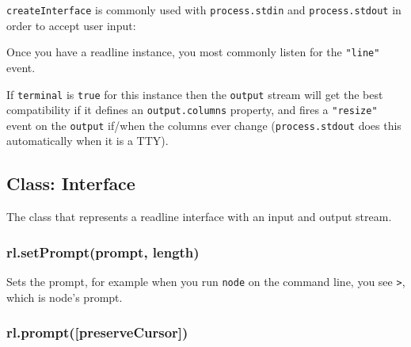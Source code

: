\begin{Shaded}
\begin{Highlighting}[]
 
  \NormalTok{callback(null, [[}\NormalTok{], linePartial]);}
\NormalTok{\}}
\end{Highlighting}
\end{Shaded}

\texttt{createInterface} is commonly used with \texttt{process.stdin}
and \texttt{process.stdout} in order to accept user input:

\begin{Shaded}
\begin{Highlighting}[]
 \NormalTok{);}
 \NormalTok{(\{}
  \NormalTok{: }\NormalTok{,}
  \NormalTok{: }
\NormalTok{\});}
\end{Highlighting}
\end{Shaded}

Once you have a readline instance, you most commonly listen for the
\texttt{"line"} event.

If \texttt{terminal} is \texttt{true} for this instance then the
\texttt{output} stream will get the best compatibility if it defines an
\texttt{output.columns} property, and fires a \texttt{"resize"} event on
the \texttt{output} if/when the columns ever change
(\texttt{process.stdout} does this automatically when it is a TTY).

\subsection{Class: Interface}

The class that represents a readline interface with an input and output
stream.

\subsubsection{rl.setPrompt(prompt, length)}

Sets the prompt, for example when you run \texttt{node} on the command
line, you see \texttt{\textgreater{}}, which is node's prompt.

\subsubsection{rl.prompt({[}preserveCursor{]})}

